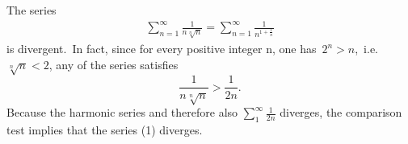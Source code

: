 \documentclass[12pt]{article}
\theoremstyle{definition}
\begin{document}
The series 
\begin{align}
\sum_{n=1}^\infty\frac{1}{n\sqrt[n]{n}} = \sum_{n=1}^\infty \frac{1}{n^{1+\frac{1}{n}}}
\end{align}
is divergent.\, In fact, since for every positive integer n, one has\, $2^n > n$,\, i.e.\, $\sqrt[n]{n} < 2$, any  of the series satisfies
$$\frac{1}{n\sqrt[n]{n}} > \frac{1}{2n}.$$
Because the harmonic series and therefore also $\sum_{1}^\infty\frac{1}{2n}$ diverges, the comparison test implies that the series (1) diverges.

\end{document}
